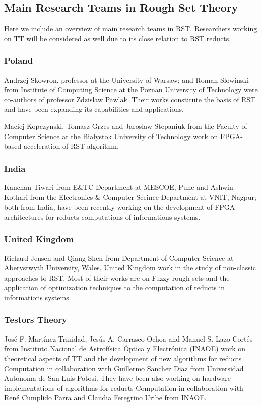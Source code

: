 \documentclass[11pt]{article}   %
\begin{document}
\subsection{Main Research Teams in Rough Set Theory}\label{mainGroups}{
  Here we include an overview of main research teams in RST. Researchers working on TT will be 
  considered as well due to its close relation to RST reducts.
  
\subsubsection{Poland}
  Andrzej Skowron, professor at the University of Warsaw; and Roman Slowinski from Institute of Computing
  Science at the Poznan University of Technology were co-authors of professor Zdzislaw Pawlak. Their works
  constitute the basis of RST and have been expanding its capabilities and applications.
  
  Maciej Kopczynski,  Tomasz Grzes and Jaroslaw Stepaniuk from the Faculty of Computer Science at the Bialystok
  University of Technology work on FPGA-based acceleration of RST algorithm.
  
\subsubsection{India}
  Kanchan Tiwari from E{\&}TC Department at MESCOE, Pune and Ashwin Kothari from the Electronics \& Computer 
  Sceince Department at VNIT, Nagpur; both from India, have been recently working on the development of FPGA 
  architectures for reducts computations of informations systems.
   
\subsubsection{United Kingdom} 
  Richard Jensen and Qiang Shen from Department of Computer Science at Aberystwyth University, Wales, United 
  Kingdom work in the study of non-classic approaches to RST. Most of their works are on Fuzzy-rough sets and 
  the application of optimization techniques to the computation of reducts in informations systems.
  
\subsubsection{Testors Theory} 
  Jos\'e F. Mart\'inez Trinidad, Jes\'us A. Carrasco Ochoa and Manuel S. Lazo Cort\'es from 
  Instituto Nacional de Astrof\'isica \'Optica y Electr\'onica (INAOE) work on theoretical aspects of TT 
  and the development of new algorithms for reducts Computation in collaboration with Guillermo Sanchez 
  Diaz from Universidad Autonoma de San Luis Potosi. They have been also working on hardware implementations
  of algorithms for reducts Computation in collaboration with Ren\'e Cumplido Parra and Claudia Feregrino 
  Uribe from INAOE.}
  
\end{document}
